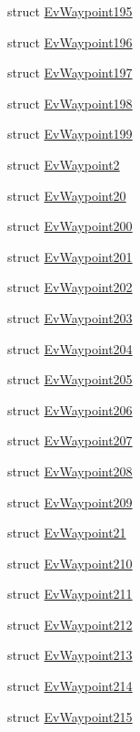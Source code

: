 \begin{DoxyCompactItemize}
struct \hyperlink{structsmacc_1_1EvWaypoint195}{Ev\+Waypoint195}
\item 
struct \hyperlink{structsmacc_1_1EvWaypoint196}{Ev\+Waypoint196}
\item 
struct \hyperlink{structsmacc_1_1EvWaypoint197}{Ev\+Waypoint197}
\item 
struct \hyperlink{structsmacc_1_1EvWaypoint198}{Ev\+Waypoint198}
\item 
struct \hyperlink{structsmacc_1_1EvWaypoint199}{Ev\+Waypoint199}
\item 
struct \hyperlink{structsmacc_1_1EvWaypoint2}{Ev\+Waypoint2}
\item 
struct \hyperlink{structsmacc_1_1EvWaypoint20}{Ev\+Waypoint20}
\item 
struct \hyperlink{structsmacc_1_1EvWaypoint200}{Ev\+Waypoint200}
\item 
struct \hyperlink{structsmacc_1_1EvWaypoint201}{Ev\+Waypoint201}
\item 
struct \hyperlink{structsmacc_1_1EvWaypoint202}{Ev\+Waypoint202}
\item 
struct \hyperlink{structsmacc_1_1EvWaypoint203}{Ev\+Waypoint203}
\item 
struct \hyperlink{structsmacc_1_1EvWaypoint204}{Ev\+Waypoint204}
\item 
struct \hyperlink{structsmacc_1_1EvWaypoint205}{Ev\+Waypoint205}
\item 
struct \hyperlink{structsmacc_1_1EvWaypoint206}{Ev\+Waypoint206}
\item 
struct \hyperlink{structsmacc_1_1EvWaypoint207}{Ev\+Waypoint207}
\item 
struct \hyperlink{structsmacc_1_1EvWaypoint208}{Ev\+Waypoint208}
\item 
struct \hyperlink{structsmacc_1_1EvWaypoint209}{Ev\+Waypoint209}
\item 
struct \hyperlink{structsmacc_1_1EvWaypoint21}{Ev\+Waypoint21}
\item 
struct \hyperlink{structsmacc_1_1EvWaypoint210}{Ev\+Waypoint210}
\item 
struct \hyperlink{structsmacc_1_1EvWaypoint211}{Ev\+Waypoint211}
\item 
struct \hyperlink{structsmacc_1_1EvWaypoint212}{Ev\+Waypoint212}
\item 
struct \hyperlink{structsmacc_1_1EvWaypoint213}{Ev\+Waypoint213}
\item 
struct \hyperlink{structsmacc_1_1EvWaypoint214}{Ev\+Waypoint214}
\item 
struct \hyperlink{structsmacc_1_1EvWaypoint215}{Ev\+Waypoint215}

\end{DoxyCompactItemize}

